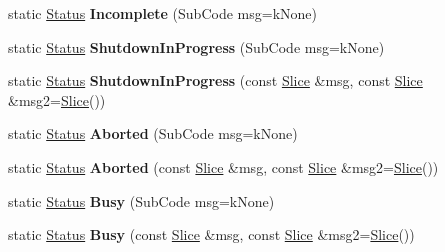 \begin{DoxyCompactItemize}
\item 
static \hyperlink{classrocksdb_1_1Status}{Status} {\bfseries Incomplete} (Sub\+Code msg=k\+None)\hypertarget{classrocksdb_1_1Status_afaba38f1c48d2059eeee00a274d6b02b}{}\label{classrocksdb_1_1Status_afaba38f1c48d2059eeee00a274d6b02b}

\item 
static \hyperlink{classrocksdb_1_1Status}{Status} {\bfseries Shutdown\+In\+Progress} (Sub\+Code msg=k\+None)\hypertarget{classrocksdb_1_1Status_a8aef9b12b426e25219a1bcc1c3259a14}{}\label{classrocksdb_1_1Status_a8aef9b12b426e25219a1bcc1c3259a14}

\item 
static \hyperlink{classrocksdb_1_1Status}{Status} {\bfseries Shutdown\+In\+Progress} (const \hyperlink{classrocksdb_1_1Slice}{Slice} \&msg, const \hyperlink{classrocksdb_1_1Slice}{Slice} \&msg2=\hyperlink{classrocksdb_1_1Slice}{Slice}())\hypertarget{classrocksdb_1_1Status_a9c0889ee08cd32f72eb0d7f900f326db}{}\label{classrocksdb_1_1Status_a9c0889ee08cd32f72eb0d7f900f326db}

\item 
static \hyperlink{classrocksdb_1_1Status}{Status} {\bfseries Aborted} (Sub\+Code msg=k\+None)\hypertarget{classrocksdb_1_1Status_a82419bdaec6f6ac233d8259b7fcd3a46}{}\label{classrocksdb_1_1Status_a82419bdaec6f6ac233d8259b7fcd3a46}

\item 
static \hyperlink{classrocksdb_1_1Status}{Status} {\bfseries Aborted} (const \hyperlink{classrocksdb_1_1Slice}{Slice} \&msg, const \hyperlink{classrocksdb_1_1Slice}{Slice} \&msg2=\hyperlink{classrocksdb_1_1Slice}{Slice}())\hypertarget{classrocksdb_1_1Status_a359bd8151b16d4bb46903105ccfa6c6c}{}\label{classrocksdb_1_1Status_a359bd8151b16d4bb46903105ccfa6c6c}

\item 
static \hyperlink{classrocksdb_1_1Status}{Status} {\bfseries Busy} (Sub\+Code msg=k\+None)\hypertarget{classrocksdb_1_1Status_afae32a6e8ad3e7b6e8b8783f88402f5d}{}\label{classrocksdb_1_1Status_afae32a6e8ad3e7b6e8b8783f88402f5d}

\item 
static \hyperlink{classrocksdb_1_1Status}{Status} {\bfseries Busy} (const \hyperlink{classrocksdb_1_1Slice}{Slice} \&msg, const \hyperlink{classrocksdb_1_1Slice}{Slice} \&msg2=\hyperlink{classrocksdb_1_1Slice}{Slice}())\hypertarget{classrocksdb_1_1Status_a89c44c7288668b9dcce3fb2b1f7925dd}{}\label{classrocksdb_1_1Status_a89c44c7288668b9dcce3fb2b1f7925dd}


\end{DoxyCompactItemize}
